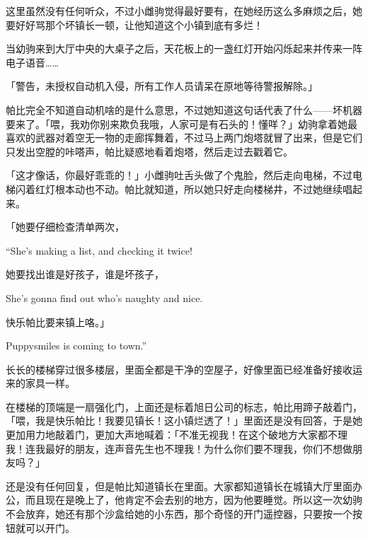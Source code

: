 这里虽然没有任何听众，不过小雌驹觉得最好要有，在她经历这么多麻烦之后，她要好好骂那个坏镇长一顿，让他知道这个小镇到底有多烂！

当幼驹来到大厅中央的大桌子之后，天花板上的一盏红灯开始闪烁起来并传来一阵电子语音……

「{\mtzh 警告，未授权自动机入侵，所有工作人员请呆在原地等待警报解除。}」

帕比完全不知道自动机啥的是什么意思，不过她知道这句话代表了什么——坏机器要来了。「喂，我劝你别来欺负我哦，人家可是有石头的！懂咩？」幼驹拿着她最喜欢的武器对着空无一物的走廊挥舞着，不过马上两门炮塔就冒了出来，但是它们只发出空膛的咔嗒声，帕比疑惑地看着炮塔，然后走过去戳着它。

「这才像话，你最好乖乖的！」小雌驹吐舌头做了个鬼脸，然后走向电梯，不过电梯闪着红灯根本动也不动。帕比就知道，所以她只好走向楼梯井，不过她继续唱起来。

\begin{song}
「她要仔细检查清单两次，


\begin{englishlyric}
    ``She's making a list, and checking it twice!
\end{englishlyric}

\medskip

她要找出谁是好孩子，谁是坏孩子，


\begin{englishlyric}
    She's gonna find out who's naughty and nice.
\end{englishlyric}

\medskip

快乐帕比要来镇上咯。」

\begin{englishlyric}
    Puppysmiles is coming to town.''
\end{englishlyric}
\end{song}

长长的楼梯穿过很多楼层，里面全都是干净的空屋子，好像里面已经准备好接收运来的家具一样。

在楼梯的顶端是一扇强化门，上面还是标着旭日公司的标志，帕比用蹄子敲着门，「喂，我是快乐帕比！我要见镇长！这小镇烂透了！」里面还是没有回答，于是她更加用力地敲着门，更加大声地喊着：「不准无视我！在这个破地方大家都不理我！连我最好的朋友，连声音先生也不理我！为什么你们要不理我，你们不想做朋友吗？」

还是没有任何回复，但是帕比知道镇长在里面。大家都知道镇长在城镇大厅里面办公，而且现在是晚上了，他肯定不会去别的地方，因为他要睡觉。所以这一次幼驹不会放弃，她还有那个沙盒给她的小东西，那个奇怪的开门遥控器，只要按一个按钮就可以开门。

